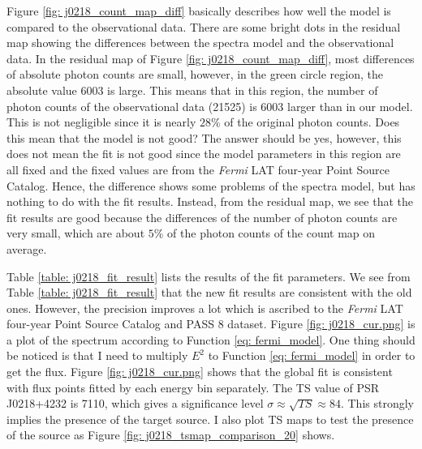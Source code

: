 \documentclass[a4paper, 12pt]{report}
\newcommand{\fgl}[0]{
  \textit{Fermi} LAT four-year Point Source Catalog
}
\begin{document}
      Figure \ref{fig: j0218_count_map_diff} basically describes how well the model is 
      compared to the observational data. There are some bright dots in 
      the residual map showing the differences between the spectra model and the 
      observational data. In the residual map of Figure \ref{fig: j0218_count_map_diff}, 
      most differences of absolute photon counts are small, however, in the green 
      circle region, the absolute value 6003 is large. This means that in this region,
      the number of photon counts of the observational data (21525) is 6003 larger than 
      in our model. This is not negligible since it is nearly $28\%$ of the original 
      photon counts. Does this mean that the model is not good? The answer should be 
      yes, however, this does not mean the fit is not good since the model parameters 
      in this region are all fixed and the fixed values are from the \textit{Fermi}
      LAT four-year Point Source Catalog. Hence, the difference shows some problems of the 
      spectra model, but has nothing to do with the fit results. Instead, from the 
      residual map, we see that the fit results are good because the differences
      of the number of photon counts are very small, which are about $5\%$ of the photon 
      counts of the count map on average.

      Table \ref{table: j0218_fit_result} lists the results of the fit parameters. 
      We see from Table \ref{table: j0218_fit_result} that the new fit results are 
      consistent with the old ones. However, the precision improves a lot which is 
      ascribed to the \fgl{} and PASS 8 dataset. Figure \ref{fig: j0218_cur.png} is a 
      plot of the spectrum according to Function \ref{eq: fermi_model}.
      One thing should be noticed is that I need to multiply $E^2$ to Function 
      \ref{eq: fermi_model} 
      in order to get the flux. Figure \ref{fig: j0218_cur.png} shows that 
      the global fit is consistent with flux points fitted by each energy bin separately. 
      The TS value of PSR J0218+4232 is 7110, which gives 
      a significance level $\sigma \approx \sqrt{TS} \approx 84$. This strongly implies the 
      presence of the target source. I also plot TS maps to test the presence of the 
      source as Figure \ref{fig: j0218_tsmap_comparison_20} shows. 
            
\end{document}
